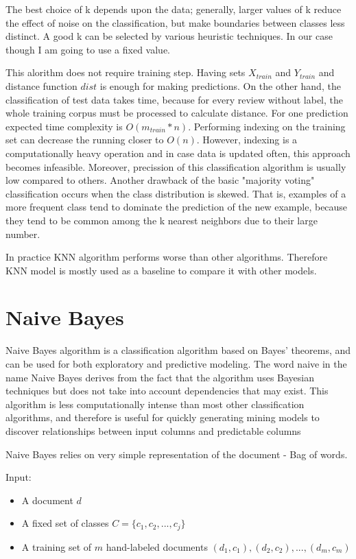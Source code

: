 \documentclass[12pt]{report}
\begin{document}
The best choice of k depends upon the data; generally, larger values of k reduce the effect of noise on the classification, but make boundaries between classes less distinct. A good k can be selected by various heuristic techniques. In our case though I am going to use a fixed value.

This alorithm does not require training step. Having sets $X_{train}$ and $Y_{train}$ and distance function $dist$ is enough for making predictions. On the other hand, the classification of test data takes time, because for every review without label, the whole training corpus must be processed to calculate distance. For one prediction expected time complexity is $O(m_{train} * n)$. Performing indexing on the training set can decrease the running closer to $O(n)$. However, indexing is a computationally heavy operation and in case data is updated often, this approach becomes infeasible. Moreover, precission of this classification algorithm is usually low compared to others. Another drawback of the basic "majority voting" classification occurs when the class distribution is skewed. That is, examples of a more frequent class tend to dominate the prediction of the new example, because they tend to be common among the k nearest neighbors due to their large number.

In practice KNN algorithm performs worse than other algorithms. Therefore KNN model is mostly used as a baseline to compare it with other models.

\newpage

\section{Naive Bayes}

Naive Bayes algorithm is a classification algorithm based on Bayes' theorems, and can be used for both exploratory and predictive modeling. The word naive in the name Naive Bayes derives from the fact that the algorithm uses Bayesian techniques but does not take into account dependencies that may exist. This algorithm is less computationally intense than most other classification algorithms, and therefore is useful for quickly generating mining models to discover relationships between input columns and predictable columns %

Naive Bayes relies on very simple representation of the document - Bag of words.

Input:

\begin{itemize}
  \item A document $d$
  \item A fixed set of classes $C=\{c_1, c_2,..., c_j\}$
  \item A training set of $m$ hand-labeled documents $(d_1, c_1), (d_2, c_2),..., (d_m, c_m)$
\end{itemize}
\end{document}
